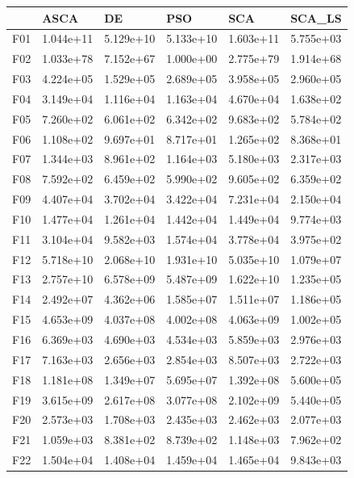 \begin{tabular}{llllll}
\toprule
{} &       ASCA &         DE &        PSO &        SCA &     SCA\_LS \\
\midrule
F01  &  1.044e+11 &  5.129e+10 &  5.133e+10 &  1.603e+11 &  5.755e+03 \\
F02  &  1.033e+78 &  7.152e+67 &  1.000e+00 &  2.775e+79 &  1.914e+68 \\
F03  &  4.224e+05 &  1.529e+05 &  2.689e+05 &  3.958e+05 &  2.960e+05 \\
F04  &  3.149e+04 &  1.116e+04 &  1.163e+04 &  4.670e+04 &  1.638e+02 \\
F05  &  7.260e+02 &  6.061e+02 &  6.342e+02 &  9.683e+02 &  5.784e+02 \\
F06  &  1.108e+02 &  9.697e+01 &  8.717e+01 &  1.265e+02 &  8.368e+01 \\
F07  &  1.344e+03 &  8.961e+02 &  1.164e+03 &  5.180e+03 &  2.317e+03 \\
F08  &  7.592e+02 &  6.459e+02 &  5.990e+02 &  9.605e+02 &  6.359e+02 \\
F09  &  4.407e+04 &  3.702e+04 &  3.422e+04 &  7.231e+04 &  2.150e+04 \\
F10  &  1.477e+04 &  1.261e+04 &  1.442e+04 &  1.449e+04 &  9.774e+03 \\
F11  &  3.104e+04 &  9.582e+03 &  1.574e+04 &  3.778e+04 &  3.975e+02 \\
F12  &  5.718e+10 &  2.068e+10 &  1.931e+10 &  5.035e+10 &  1.079e+07 \\
F13  &  2.757e+10 &  6.578e+09 &  5.487e+09 &  1.622e+10 &  1.235e+05 \\
F14  &  2.492e+07 &  4.362e+06 &  1.585e+07 &  1.511e+07 &  1.186e+05 \\
F15  &  4.653e+09 &  4.037e+08 &  4.002e+08 &  4.063e+09 &  1.002e+05 \\
F16  &  6.369e+03 &  4.690e+03 &  4.534e+03 &  5.859e+03 &  2.976e+03 \\
F17  &  7.163e+03 &  2.656e+03 &  2.854e+03 &  8.507e+03 &  2.722e+03 \\
F18  &  1.181e+08 &  1.349e+07 &  5.695e+07 &  1.392e+08 &  5.600e+05 \\
F19  &  3.615e+09 &  2.617e+08 &  3.077e+08 &  2.102e+09 &  5.440e+05 \\
F20  &  2.573e+03 &  1.708e+03 &  2.435e+03 &  2.462e+03 &  2.077e+03 \\
F21  &  1.059e+03 &  8.381e+02 &  8.739e+02 &  1.148e+03 &  7.962e+02 \\
F22  &  1.504e+04 &  1.408e+04 &  1.459e+04 &  1.465e+04 &  9.843e+03 \\

\end{tabular}
